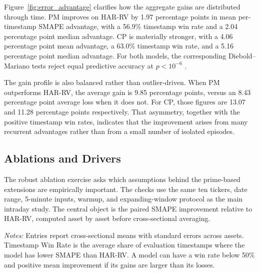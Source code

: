 ﻿\documentclass[a4paper]{article}
\begin{document}
\noindent
Figure~\ref{fig:error_advantage} clarifies how the aggregate gains are distributed through time. PM improves on HAR-RV by 1.97 percentage points in mean per-timestamp SMAPE advantage, with a 56.9\% timestamp win rate and a 2.04 percentage point median advantage. CP is materially stronger, with a 4.06 percentage point mean advantage, a 63.0\% timestamp win rate, and a 5.16 percentage point median advantage. For both models, the corresponding Diebold--Mariano tests reject equal predictive accuracy at $p < 10^{-6}$ \cite{diebold1995}.

\noindent
The gain profile is also balanced rather than outlier-driven. When PM outperforms HAR-RV, the average gain is 9.85 percentage points, versus an 8.43 percentage point average loss when it does not. For CP, those figures are 13.07 and 11.28 percentage points respectively. That asymmetry, together with the positive timestamp win rates, indicates that the improvement arises from many recurrent advantages rather than from a small number of isolated episodes.

\subsection{Ablations and Drivers}

\noindent
The robust ablation exercise asks which assumptions behind the prime-based extensions are empirically important. The checks use the same ten tickers, date range, 5-minute inputs, warmup, and expanding-window protocol as the main intraday study. The central object is the paired SMAPE improvement relative to HAR-RV, computed asset by asset before cross-sectional averaging.

{\renewcommand{\thetable}{3}
\begin{center}
\label{tab:param_efficiency}
\small
\renewcommand{\arraystretch}{1.12}
\setlength{\tabcolsep}{5pt}
\resizebox{0.98\textwidth}{!}{}

\vspace{0.1cm}
\footnotesize \parbox{0.92\textwidth}{\textit{Notes:} Entries report cross-sectional means with standard errors across assets. Timestamp Win Rate is the average share of evaluation timestamps where the model has lower SMAPE than HAR-RV. A model can have a win rate below 50\% and positive mean improvement if its gains are larger than its losses.}
\end{center}}
\end{document}
